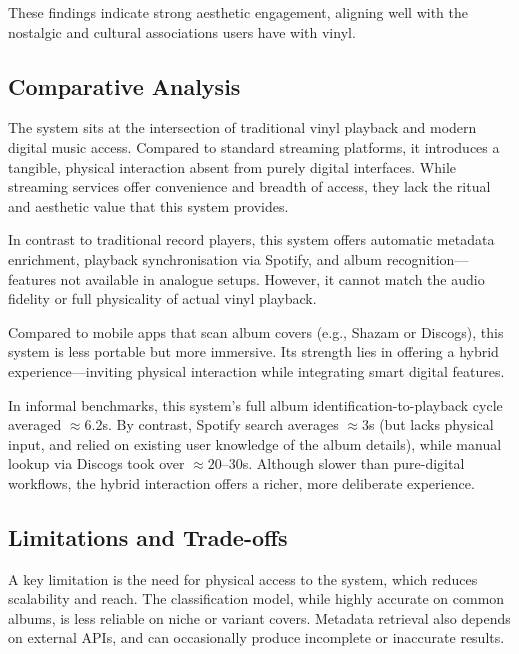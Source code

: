                 These findings indicate strong aesthetic engagement, aligning well with the nostalgic and cultural associations users have with vinyl.
            
        \subsection{Comparative Analysis}
            
            The system sits at the intersection of traditional vinyl playback and modern digital music access. Compared to standard streaming platforms, it introduces a tangible, physical interaction absent from purely digital interfaces. While streaming services offer convenience and breadth of access, they lack the ritual and aesthetic value that this system provides.
    
            In contrast to traditional record players, this system offers automatic metadata enrichment, playback synchronisation via Spotify, and album recognition—features not available in analogue setups. However, it cannot match the audio fidelity or full physicality of actual vinyl playback.
            
            Compared to mobile apps that scan album covers (e.g., Shazam or Discogs), this system is less portable but more immersive. Its strength lies in offering a hybrid experience—inviting physical interaction while integrating smart digital features.
    
            In informal benchmarks, this system’s full album identification-to-playback cycle averaged $\approx 6.2$s. By contrast, Spotify search averages $\approx 3$s (but lacks physical input, and relied on existing user knowledge of the album details), while manual lookup via Discogs took over $\approx 20–30$s. Although slower than pure-digital workflows, the hybrid interaction offers a richer, more deliberate experience.
    
        \subsection{Limitations and Trade-offs}
    
            A key limitation is the need for physical access to the system, which reduces scalability and reach. The classification model, while highly accurate on common albums, is less reliable on niche or variant covers. Metadata retrieval also depends on external APIs, and can occasionally produce incomplete or inaccurate results.
    
